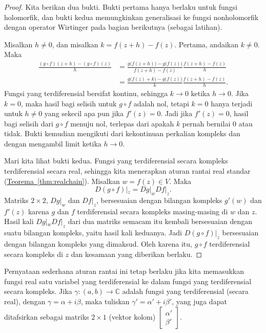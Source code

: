\documentclass[12pt,openany]{book}
\newcommand{\C}{{\mathbb{C}}}
\theoremstyle{plain}
\theoremstyle{remark}
\theoremstyle{definition}
\theoremstyle{exercise}
\theoremstyle{example}
\newcommand{\thmref}[1]{\hyperref[#1]{Teorema~\ref*{#1}}}
\begin{document}
\begin{proof}
Kita berikan dua bukti.  Bukti pertama hanya berlaku untuk fungsi
holomorfik, dan bukti kedua memungkinkan generalisasi ke fungsi nonholomorfik
dengan operator Wirtinger pada bagian berikutnya (sebagai latihan).

Misalkan $h \neq 0$, dan misalkan $k = f(z+h) -f(z)$.
Pertama, andaikan $k \neq 0$.
Maka
\begin{equation*}
\begin{split}
\frac{(g \circ f)(z+h) - (g \circ f)(z)}{h}
& =
\frac{g \bigl( f(z+h) \bigr) - g\bigl( f(z) \bigr)}{f(z+h)-f(z)}
\frac{f(z+h)-f(z)}{h}
\\
& =
\frac{g \bigl( f(z) + k \bigr) - g\bigl( f(z) \bigr)}{k}
\frac{f(z+h)-f(z)}{h} .
\end{split}
\end{equation*}
Fungsi yang terdiferensial bersifat kontinu, sehingga $k \to 0$ ketika $h \to 0$.
Jika $k=0$, maka hasil bagi selisih untuk $g \circ f$ adalah nol, tetapi $k=0$
hanya terjadi untuk $h \neq 0$ yang sekecil apa pun jika
$f'(z)=0$.  Jadi jika $f'(z)=0$,
hasil bagi
selisih dari $g \circ f$ menuju nol, terlepas dari apakah
$k$ pernah bernilai $0$ atau tidak.
Bukti kemudian mengikuti dari kekontinuan perkalian kompleks dan dengan mengambil
limit ketika $h \to 0$.

Mari kita lihat bukti kedua.
Fungsi yang terdiferensial secara kompleks terdiferensial secara real, sehingga
kita menerapkan aturan rantai real standar (\thmref{thm:realchain}).
Misalkan $w = f(z) \in V$.  Maka
\begin{equation*}
D(g \circ f)|_z = Dg|_w Df|_z .
\end{equation*}
Matriks $2 \times 2$, $Dg|_w$ dan $Df|_z$, bersesuaian dengan bilangan kompleks
$g'(w)$ dan $f'(z)$ karena $g$ dan $f$ terdiferensial secara kompleks masing-masing di $w$
dan $z$.
Hasil kali $Dg|_w Df|_z$
dari dua matriks semacam itu kembali bersesuaian dengan suatu bilangan kompleks, yaitu hasil kali
keduanya.
Jadi $D(g \circ f)|_z$ bersesuaian dengan bilangan kompleks yang dimaksud.
Oleh karena itu, $g \circ f$ terdiferensial secara kompleks di $z$ dan kesamaan yang diberikan berlaku.
\end{proof}

Pernyataan sederhana aturan rantai ini tetap berlaku
jika kita memasukkan fungsi real satu variabel yang terdiferensial
ke dalam fungsi yang terdiferensial secara
kompleks.  Jika $\gamma \colon (a,b)
\to \C$ adalah fungsi yang terdiferensial (secara real), dengan
$\gamma = \alpha + i \beta$,
maka tuliskan $\gamma' = \alpha' + i \beta'$, yang juga dapat ditafsirkan
sebagai matriks $2 \times 1$ (vektor kolom)
$\left[\begin{smallmatrix}\alpha'\\\beta'\end{smallmatrix}\right]$.
\end{document}

